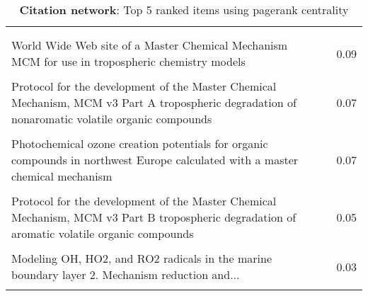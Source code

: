 \begin{table}[H]
     \begin{tabular}{p{}p{}c}
     \toprule
      & & \\\\
     World Wide Web site of a Master Chemical Mechanism MCM for use in tropospheric chemistry models & \cite{pagerank0} & 0.09  \\ \\
        Protocol for the development of the Master Chemical Mechanism, MCM v3 Part A tropospheric degradation of nonaromatic volatile organic compounds & \cite{pagerank1} & 0.07  \\ \\
        Photochemical ozone creation potentials for organic compounds in northwest Europe calculated with a master chemical mechanism & \cite{pagerank2} & 0.07  \\ \\
        Protocol for the development of the Master Chemical Mechanism, MCM v3 Part B tropospheric degradation of aromatic volatile organic compounds & \cite{pagerank3} & 0.05  \\ \\
        Modeling OH, HO2, and RO2 radicals in the marine boundary layer 2. Mechanism reduction and... & \cite{pagerank4} & 0.03  \\ \\
        \bottomrule
    \end{tabular}
    \label{tab:pagerank_Citation}
    \caption{\textbf{Citation network}: Top 5 ranked items using pagerank centrality}
    \end{table}

    